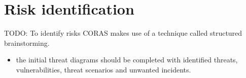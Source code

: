 \section{Risk identification}

TODO:
To identify risks CORAS makes use of a technique called
structured brainstorming.

\begin{itemize}
    \item the initial threat diagrams should be completed with
identified threats, vulnerabilities, threat scenarios and
unwanted incidents. 
\end{itemize}